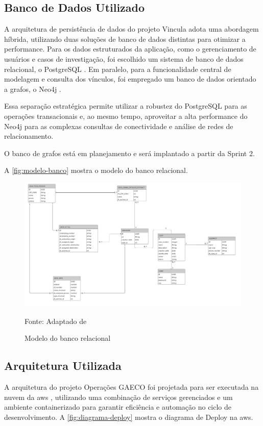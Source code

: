 \subsection{Banco de Dados Utilizado}
  A arquitetura de persistência de dados do projeto Vincula adota uma abordagem híbrida, utilizando duas soluções de banco de dados distintas para otimizar a performance. Para os dados estruturados da aplicação, como o gerenciamento de usuários e casos de investigação, foi escolhido um sistema de banco de dados relacional, o PostgreSQL \cite{postgresql}. Em paralelo, para a funcionalidade central de modelagem e consulta dos vínculos, foi empregado um banco de dados orientado a grafos, o Neo4j \cite{neo4j}.

  Essa separação estratégica permite utilizar a robustez do PostgreSQL para as operações transacionais e, ao mesmo tempo, aproveitar a alta performance do Neo4j para as complexas consultas de conectividade e análise de redes de relacionamento.
  
  O banco de grafos está em planejamento e será implantado a partir da Sprint 2.

  A \autoref{fig:modelo-banco} mostra o modelo do banco relacional.

  \begin{figure}[H]
    \centering
    \small
    \includegraphics[width=1\linewidth]{conteudo//2 - ages I//conteudo//figures//banco-postgresql.jpeg}
    \caption{Modelo do banco relacional}
    Fonte: Adaptado de \textcites{wiki-vincula}
    \label{fig:modelo-banco}
  \end{figure}

\newpage
\subsection{Arquitetura Utilizada}
  A arquitetura do projeto Operações GAECO foi projetada para ser executada na nuvem da \ac{aws} \cite{aws}, utilizando uma combinação de serviços gerenciados e um ambiente containerizado para garantir eficiência e automação no ciclo de desenvolvimento. A \autoref{fig:diagrama-deploy} mostra o diagrama de Deploy na \acs{aws}.

